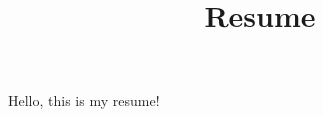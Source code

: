 \documentclass{article}
\begin{document}
        \title{Resume}
        \maketitle
        Hello, this is my resume!
        
\end{document}
